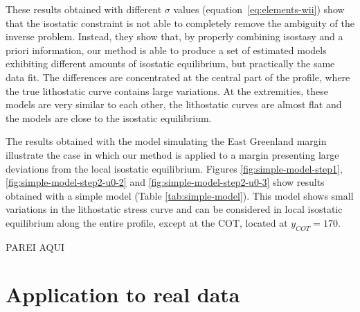 \documentclass[manuscript,revised]{geophysics}
\begin{document}
These results obtained with different $\sigma$ values (equation~\ref{eq:elements-wii})
show that the isostatic constraint is not able to completely
remove the ambiguity of the inverse problem. Instead, they show that, by properly
combining isostasy and a priori information, our method is able to
produce a set of estimated models exhibiting different 
amounts of isostatic equilibrium, but practically the same data fit. 
The differences are concentrated at the central part of the profile, where the
true lithostatic curve contains large variations. At the extremities, these models
are very similar to each other, the lithostatic curves are almost flat 
and the models are close to the isostatic equilibrium.

The results obtained with the model simulating the East Greenland margin illustrate
the case in which our method is applied to a margin presenting large deviations from
the local isostatic equilibrium. Figures 
\ref{fig:simple-model-step1}, \ref{fig:simple-model-step2-u0-2} and 
\ref{fig:simple-model-step2-u0-3} show results obtained with
a simple model (Table \ref{tab:simple-model}).
This model shows small variations in the lithostatic stress curve and can
be considered in local isostatic equilibrium along the entire profile, except at
the COT, located at $y_{COT} = 170$.

PAREI AQUI




\section{Application to real data}
\end{document}
